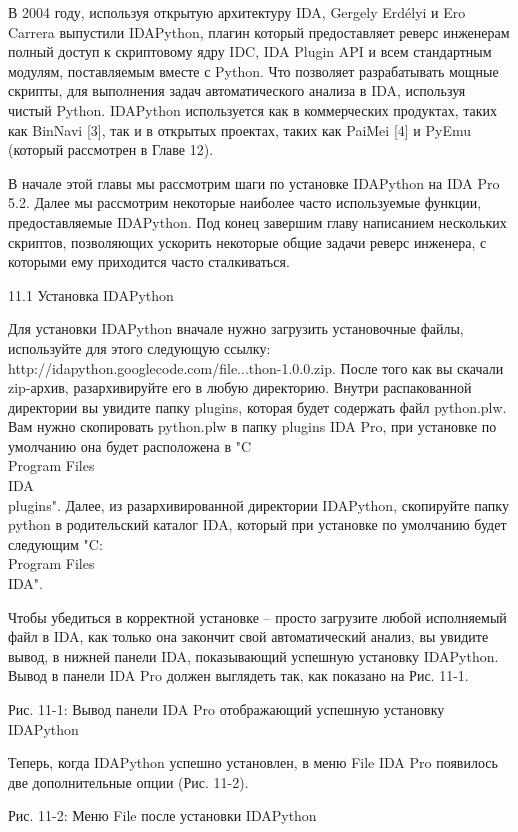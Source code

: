 \documentclass[12pt]{book}
\begin{document}
В 2004 году, используя открытую архитектуру IDA, Gergely Erdélyi и Ero Carrera выпустили IDAPython, плагин который предоставляет реверс инженерам полный доступ к скриптовому ядру IDC, IDA Plugin API и всем стандартным модулям, поставляемым вместе с Python. Что позволяет разрабатывать мощные скрипты, для выполнения задач автоматического анализа в IDA, используя чистый Python. IDAPython используется как в коммерческих продуктах, таких как BinNavi [3], так и в открытых проектах, таких как PaiMei [4] и PyEmu (который рассмотрен в Главе 12).

В начале этой главы мы рассмотрим шаги по установке IDAPython на IDA Pro 5.2. Далее мы рассмотрим некоторые наиболее часто используемые функции, предоставляемые IDAPython. Под конец завершим главу написанием нескольких скриптов, позволяющих ускорить некоторые общие задачи реверс инженера, с которыми ему приходится часто сталкиваться. 


11.1 Установка IDAPython

Для установки IDAPython вначале нужно загрузить установочные файлы, используйте для этого следующую ссылку:
http://idapython.googlecode.com/file...thon-1.0.0.zip.
После того как вы скачали zip-архив, разархивируйте его в любую директорию. Внутри распакованной директории вы увидите папку plugins, которая будет содержать файл python.plw. Вам нужно скопировать python.plw в папку plugins IDA Pro, при установке по умолчанию она будет расположена в "C\\Program Files\\IDA\\plugins". Далее, из разархивированной директории IDAPython, скопируйте папку python в родительский каталог IDA, который при установке по умолчанию будет следующим "C:\\Program Files\\IDA". 

Чтобы убедиться в корректной установке – просто загрузите любой исполняемый файл в IDA, как только она закончит свой автоматический анализ, вы увидите вывод, в нижней панели IDA, показывающий успешную установку IDAPython. Вывод в панели IDA Pro должен выглядеть так, как показано на Рис. 11-1.




Рис. 11-1: Вывод панели IDA Pro отображающий успешную установку IDAPython

Теперь, когда IDAPython успешно установлен, в меню File IDA Pro появилось две дополнительные опции (Рис. 11-2).


Рис. 11-2: Меню File после установки IDAPython
\end{document}
